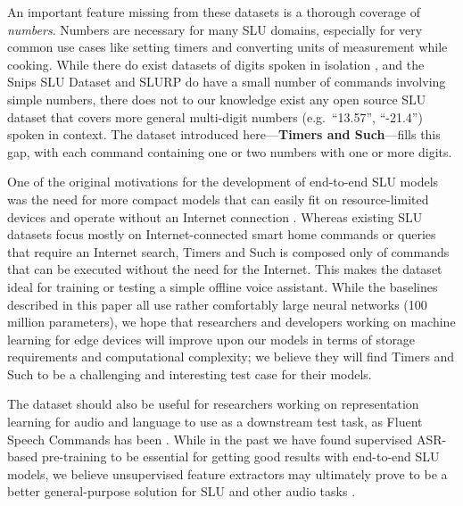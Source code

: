 \documentclass{article}
\begin{document}
An important feature missing from these datasets is a thorough coverage of \textit{numbers}. Numbers are necessary for many SLU domains, especially for very common use cases like setting timers and converting units of measurement while cooking. 
While there do exist datasets of digits spoken in isolation \cite{leonard1993tidigits, warden2018speech, zohar_jackson_2018_1342401}, and the Snips SLU Dataset and SLURP do have a small number of commands involving simple numbers, there does not to our knowledge exist any open source SLU dataset that covers more general multi-digit numbers (e.g.~``13.57'', ``-21.4'') spoken in context. The dataset introduced here---\textbf{Timers and Such}---fills this gap, with each command containing one or two numbers with one or more digits. 

One of the original motivations for the development of end-to-end SLU models was the need for more compact models that can easily fit on resource-limited devices and operate without an Internet connection \cite{Serdyuk2018}. Whereas existing SLU datasets focus mostly on Internet-connected smart home commands or queries that require an Internet search, Timers and Such is composed only of commands that can be executed without the need for the Internet. This makes the dataset ideal for training or testing a simple offline voice assistant. While the baselines described in this paper all use rather comfortably large neural networks (100 million parameters), we hope that researchers and developers working on machine learning for edge devices will improve upon our models in terms of storage requirements and computational complexity; we believe they will find Timers and Such to be a challenging and interesting test case for their models. 

The dataset should also be useful for researchers working on representation learning for audio and language to use as a downstream test task, as Fluent Speech Commands has been \cite{tamkin2020viewmaker, chung2020semi}. While in the past we have found supervised ASR-based pre-training to be essential for getting good results with end-to-end SLU models, we believe unsupervised feature extractors may ultimately prove to be a better general-purpose solution for SLU and other audio tasks \cite{pascual2019learning, baevski2020wav2vec}.
\end{document}

